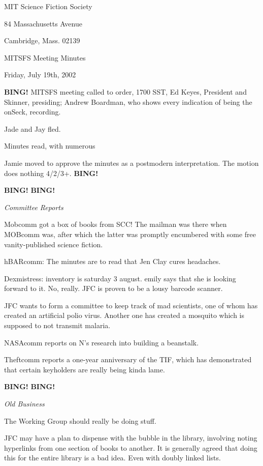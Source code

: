 \documentclass[12pt]{article}
\newcommand{\bing}{{\bf BING!} }
\newcommand{\goto}[1]{\bing \vskip 12pt \centerline{{\em{#1}}}}
\begin{document}
\begin{center}

MIT Science Fiction Society 

84 Massachusetts Avenue

Cambridge, Mass. 02139

\vspace{12pt}

MITSFS Meeting Minutes 

Friday, July 19th, 2002

\end{center}
 
\vspace{18pt}

\setlength{\parskip}{6pt}

\noindent
\bing
MITSFS meeting called to order, 1700 SST, Ed Keyes, President and
Skinner, presiding; Andrew Boardman, who shows every indication of being
the onSeck, recording.

Jade and Jay fled.

Minutes read, with numerous 

Jamie moved to approve the minutes as a postmodern interpretation.
The motion does nothing 4/2/3+. \bing

\bing \goto{Committee Reports}

Mobcomm got a box of books from SCC!  The mailman was there when MOBcomm
was, after which the latter was promptly encumbered with some free
vanity-published science fiction.

hBARcomm: The minutes are to read that Jen Clay cures headaches.

Dexmistress: inventory is saturday 3 august.  emily says that she is looking
forward to it.  No, really.  JFC is proven to be a lousy barcode scanner.

JFC wants to form a committee to keep track of mad scientists, one of
whom has created an artificial polio virus.  Another one has created a
mosquito which is supposed to not transmit malaria.

NASAcomm reports on N's research into building a beanstalk.

Theftcomm reports a one-year anniversary of the TIF, which has
demonstrated that certain keyholders are really being kinda lame.

\bing \goto{Old Business}

The Working Group should really be doing stuff.

JFC may have a plan to dispense with the bubble in the library, involving
noting hyperlinks from one section of books to another.  It is generally
agreed that doing this for the entire library is a bad idea.  Even with
doubly linked lists.
\end{document}
